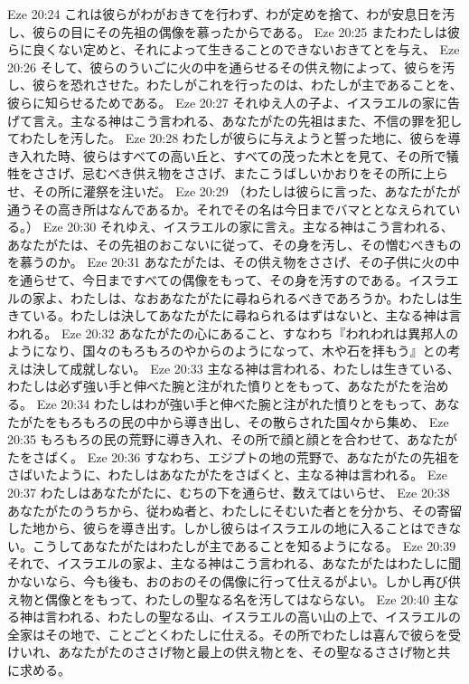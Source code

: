 Eze 20:24  これは彼らがわがおきてを行わず、わが定めを捨て、わが安息日を汚し、彼らの目にその先祖の偶像を慕ったからである。
Eze 20:25  またわたしは彼らに良くない定めと、それによって生きることのできないおきてとを与え、
Eze 20:26  そして、彼らのういごに火の中を通らせるその供え物によって、彼らを汚し、彼らを恐れさせた。わたしがこれを行ったのは、わたしが主であることを、彼らに知らせるためである。
Eze 20:27  それゆえ人の子よ、イスラエルの家に告げて言え。主なる神はこう言われる、あなたがたの先祖はまた、不信の罪を犯してわたしを汚した。
Eze 20:28  わたしが彼らに与えようと誓った地に、彼らを導き入れた時、彼らはすべての高い丘と、すべての茂った木とを見て、その所で犠牲をささげ、忌むべき供え物をささげ、またこうばしいかおりをその所に上らせ、その所に灌祭を注いだ。
Eze 20:29  （わたしは彼らに言った、あなたがたが通うその高き所はなんであるか。それでその名は今日までバマととなえられている。）
Eze 20:30  それゆえ、イスラエルの家に言え。主なる神はこう言われる、あなたがたは、その先祖のおこないに従って、その身を汚し、その憎むべきものを慕うのか。
Eze 20:31  あなたがたは、その供え物をささげ、その子供に火の中を通らせて、今日まですべての偶像をもって、その身を汚すのである。イスラエルの家よ、わたしは、なおあなたがたに尋ねられるべきであろうか。わたしは生きている。わたしは決してあなたがたに尋ねられるはずはないと、主なる神は言われる。
Eze 20:32  あなたがたの心にあること、すなわち『われわれは異邦人のようになり、国々のもろもろのやからのようになって、木や石を拝もう』との考えは決して成就しない。
Eze 20:33  主なる神は言われる、わたしは生きている、わたしは必ず強い手と伸べた腕と注がれた憤りとをもって、あなたがたを治める。
Eze 20:34  わたしはわが強い手と伸べた腕と注がれた憤りとをもって、あなたがたをもろもろの民の中から導き出し、その散らされた国々から集め、
Eze 20:35  もろもろの民の荒野に導き入れ、その所で顔と顔とを合わせて、あなたがたをさばく。
Eze 20:36  すなわち、エジプトの地の荒野で、あなたがたの先祖をさばいたように、わたしはあなたがたをさばくと、主なる神は言われる。
Eze 20:37  わたしはあなたがたに、むちの下を通らせ、数えてはいらせ、
Eze 20:38  あなたがたのうちから、従わぬ者と、わたしにそむいた者とを分かち、その寄留した地から、彼らを導き出す。しかし彼らはイスラエルの地に入ることはできない。こうしてあなたがたはわたしが主であることを知るようになる。
Eze 20:39  それで、イスラエルの家よ、主なる神はこう言われる、あなたがたはわたしに聞かないなら、今も後も、おのおのその偶像に行って仕えるがよい。しかし再び供え物と偶像とをもって、わたしの聖なる名を汚してはならない。
Eze 20:40  主なる神は言われる、わたしの聖なる山、イスラエルの高い山の上で、イスラエルの全家はその地で、ことごとくわたしに仕える。その所でわたしは喜んで彼らを受けいれ、あなたがたのささげ物と最上の供え物とを、その聖なるささげ物と共に求める。
